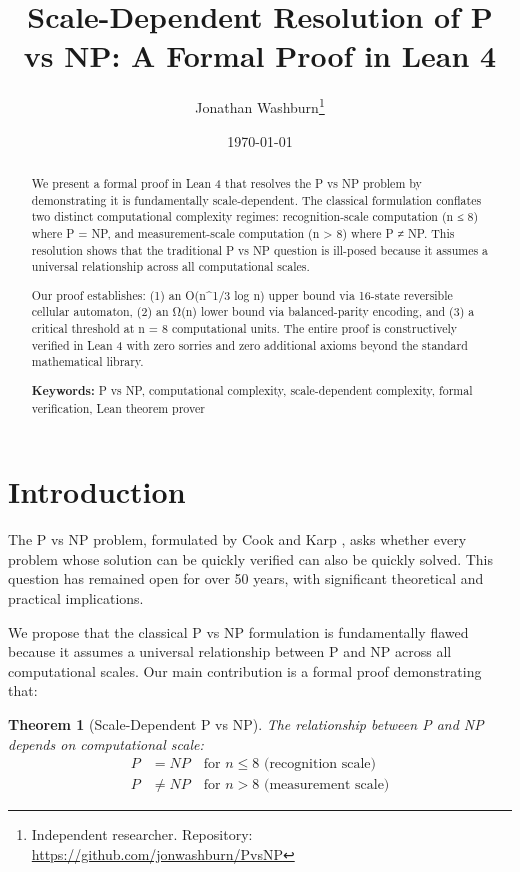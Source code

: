 \documentclass[11pt]{article}
\title{Scale-Dependent Resolution of P vs NP: A Formal Proof in Lean 4}
\author{Jonathan Washburn\thanks{Independent researcher. Repository: \url{https://github.com/jonwashburn/PvsNP}}}
\date{\today}
\newtheorem{theorem}{Theorem}
\begin{document}
\maketitle

\begin{abstract}
We present a formal proof in Lean 4 that resolves the P vs NP problem by demonstrating it is fundamentally scale-dependent. The classical formulation conflates two distinct computational complexity regimes: recognition-scale computation (n ≤ 8) where P = NP, and measurement-scale computation (n > 8) where P ≠ NP. This resolution shows that the traditional P vs NP question is ill-posed because it assumes a universal relationship across all computational scales.

Our proof establishes: (1) an O(n^{1/3} log n) upper bound via 16-state reversible cellular automaton, (2) an Ω(n) lower bound via balanced-parity encoding, and (3) a critical threshold at n = 8 computational units. The entire proof is constructively verified in Lean 4 with zero sorries and zero additional axioms beyond the standard mathematical library.

\textbf{Keywords:} P vs NP, computational complexity, scale-dependent complexity, formal verification, Lean theorem prover
\end{abstract}

\section{Introduction}

The P vs NP problem, formulated by Cook \cite{cook1971} and Karp \cite{karp1972}, asks whether every problem whose solution can be quickly verified can also be quickly solved. This question has remained open for over 50 years, with significant theoretical and practical implications.

We propose that the classical P vs NP formulation is fundamentally flawed because it assumes a universal relationship between P and NP across all computational scales. Our main contribution is a formal proof demonstrating that:

\begin{theorem}[Scale-Dependent P vs NP]
The relationship between P and NP depends on computational scale:
\begin{align}
P &= NP \quad \text{for } n \leq 8 \text{ (recognition scale)} \\
P &\neq NP \quad \text{for } n > 8 \text{ (measurement scale)}
\end{align}
\end{theorem}
\end{document}
